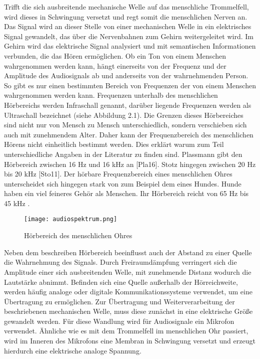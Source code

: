 Trifft die sich ausbreitende mechanische Welle auf das menschliche Trommelfell, wird dieses in Schwingung versetzt und regt somit die menschlichen Nerven an. Das Signal wird an dieser Stelle von einer mechanischen Welle in ein elektrisches Signal gewandelt, das über die Nervenbahnen zum Gehirn weitergeleitet wird. Im Gehirn wird das elektrische Signal analysiert und mit semantischen Informationen verbunden, die das Hören ermöglichen. Ob ein Ton von einem Menschen wahrgenommen werden kann, hängt einerseits von der Frequenz und der Amplitude des Audiosignals ab und anderseits von der wahrnehmenden Person. So gibt es nur einen bestimmten Bereich von Frequenzen der von einem Menschen wahrgenommen werden kann. Frequenzen unterhalb des menschlichen Hörbereichs werden Infraschall genannt, darüber liegende Frequenzen werden als Ultraschall bezeichnet (siehe Abbildung 2.1). Die Grenzen dieses Hörbereiches sind nicht nur von Mensch zu Mensch unterschiedlich, sondern verschieben sich auch mit zunehmendem Alter. Daher kann der Frequenzbereich des menschlichen Hörens nicht einheitlich bestimmt werden. Dies erklärt warum zum Teil unterschiedliche Angaben in der Literatur zu finden sind. Plassmann gibt den Hörbereich zwischen 16 Hz und 16 kHz an [Pla16]. Stotz hingegen zwischen 20 Hz bis 20 kHz [Sto11]. Der hörbare Frequenzbereich eines menschlichen Ohres unterscheidet sich hingegen stark von zum Beispiel dem eines Hundes. Hunde haben ein viel feineres Gehör als Menschen. Ihr Hörbereich reicht von 65 Hz bis 45 kHz .
\begin{figure}[H]
	\centering
	\texttt{[image: audiospektrum.png]}
	\caption[Hörbereich des menschlichen Ohres]{Hörbereich des menschlichen Ohres} \cite{michelsSonographieOrganUnd2012}
	\label{fig:audiospektrum}
\end{figure}
Neben dem beschreiben Hörbereich beeinflusst auch der Abstand zu einer Quelle die Wahrnehmung des Signals. Durch Freiraumdämpfung verringert sich die Amplitude einer sich
ausbreitenden Welle, mit zunehmende Distanz wodurch die Lautstärke abnimmt. Befinden
sich eine Quelle außerhalb der Hörreichweite, werden häufig analoge oder digitale Kommunikationssysteme verwendet, um eine Übertragung zu ermöglichen. Zur Übertragung und Weiterverarbeitung der beschriebenen mechanischen Welle, muss diese zunächst in eine elektrische Größe gewandelt werden.
Für diese Wandlung wird für Audiosignale ein Mikrofon verwendet. Ähnliche wie es mit dem Trommelfell im menschlichen Ohr passiert, wird im Inneren des Mikrofons eine Membran in Schwingung versetzt und erzeugt hierdurch eine elektrische analoge Spannung.

